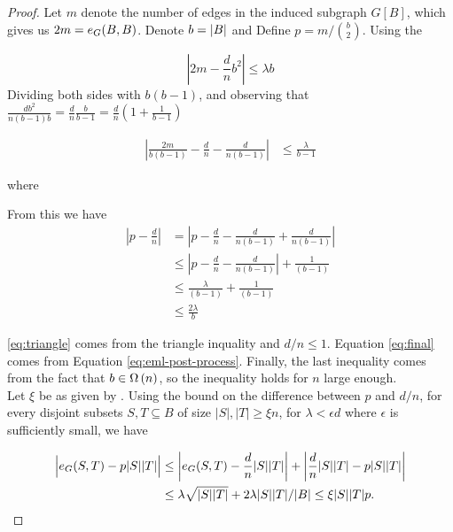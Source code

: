 \documentclass[11pt]{article}
\begin{document}
\begin{proof}
  Let $m$ denote the number of edges in the induced subgraph $G[B]$, which gives us $2m = \CutEdges{B}{B}{G}$.
Denote $b \Def \Size{B}$ and Define $p = m / \binom{b}{2}$. Using the 

\[ \left| 2m - \frac{d}{n}b^2 \right| \le \lambda b \]
Dividing both sides with $b(b-1)$, and observing that $\frac{db^2}{n(b-1)b} = \frac{d}{n}\frac{b}{b-1} = \frac{d}{n}(1 + \frac{1}{b-1})$

\begin{align}
\left| \frac{2m}{b(b-1)} - \frac{d}{n} - \frac{d}{n(b-1)} \right| &\le \frac{\lambda}{b-1}  \label{eq:eml-post-process}
\end{align}

where 

From this we have 
\begin{align}
  \left| p - \frac{d}{n}\right| &= \left| p - \frac{d}{n} - \frac{d}{n(b-1)} + \frac{d}{n(b-1)}\right|  \\
                                &\le \left| p - \frac{d}{n} - \frac{d}{n(b-1)} \right| + \frac{1}{(b-1)} \label{eq:triangle}\\
                                &\le \frac{\lambda}{(b-1)} + \frac{1}{(b-1)}  \label{eq:final} \\
  & \le \frac{2\lambda}{b} 
\end{align}

\eqref{eq:triangle} comes from the triangle inquality and  $d/n \le 1$.
Equation \eqref{eq:final} comes from Equation \eqref{eq:eml-post-process}.
Finally, the last inequality comes from the fact that $b \in \BigOmega{n}$, so the inequality holds for $n$ large enough.\\

Let $\xi$ be as given by . Using the bound on the difference between $p$ and $d/n$, for every disjoint subsets $S, T \subseteq B$ of size $|S|,|T| \ge \xi n$, for $\lambda < \epsilon d$ where $\epsilon$ is sufficiently small, we have

\begin{align*}
  \Bigl| \CutEdges{S}{T}{G}  - p|S||T| \Bigr| &\le \left| \CutEdges{S}{T}{G} - \frac{d}{n}|S||T| \right| + \left| \frac{d}{n}|S||T| - p|S||T| \right| \\
                                    &\le \lambda \sqrt{|S||T|} + 2 \lambda |S||T| / |B| \le \xi |S||T|p. 
    \end{align*}


\end{proof}
\end{document}
